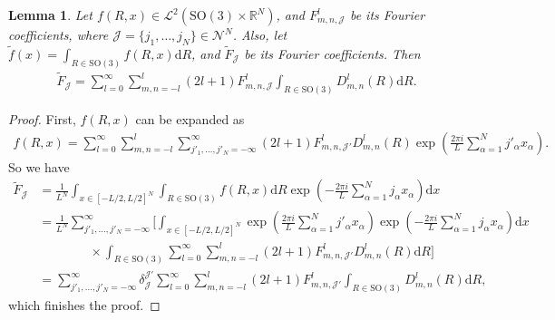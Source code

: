 \documentclass[10pt]{article}
\newtheorem{lemma}{Lemma}
\newcommand{\SO}{\ensuremath{\mathrm{SO}(3)}}
\newcommand{\diff}[1]{\mathrm{d}#1}
\newcommand{\real}{\ensuremath{\mathbb{R}}}
\begin{document}
\begin{lemma} \label{lemma:marginal Fourier}
	Let $f(R,x)\in\mathcal{L}^2(\SO\times\real^N)$, and $F^l_{m,n,\mathcal{J}}$ be its Fourier coefficients, where $\mathcal{J} = \{j_1,\ldots,j_N\} \in \mathcal{N}^N$.
	Also, let $\tilde{f}(x) = \int_{R\in\SO} f(R,x) \diff{R}$, and $\tilde{F}_\mathcal{J}$ be its Fourier coefficients.
	Then
	\begin{align}
		\tilde{F}_{\mathcal{J}} = \sum_{l=0}^\infty \sum_{m,n=-l}^l (2l+1) F^l_{m,n,\mathcal{J}} \int_{R\in\SO} D^l_{m,n}(R) \diff{R}.
	\end{align}
\end{lemma}
\begin{proof}
	First, $f(R,x)$ can be expanded as
	\begin{align*}
		f(R,x) = \sum_{l=0}^\infty \sum_{m,n=-l}^l \sum_{j'_1,\ldots,j'_N=-\infty}^\infty (2l+1) F^l_{m,n,\mathcal{J}'} D^l_{m,n}(R) \exp\left( \frac{2\pi i}{L} \sum_{\alpha=1}^N j'_\alpha x_\alpha \right).
	\end{align*}
	So we have
	\begin{align*}
		\tilde{F}_\mathcal{J} &= \frac{1}{L^N} \int_{x\in[-L/2,L/2]^N} \int_{R\in\SO} f(R,x) \diff{R} \exp\left( -\frac{2\pi i}{L} \sum_{\alpha=1}^N j_\alpha x_\alpha \right) \diff{x} \\
		&= \frac{1}{L^N} \sum_{j'_1,\ldots,j'_N=-\infty}^\infty \bigg[ \int_{x\in[-L/2,L/2]^N}  \exp\left( \frac{2\pi i}{L} \sum_{\alpha=1}^N j'_\alpha x_\alpha \right) \exp\left( -\frac{2\pi i}{L} \sum_{\alpha=1}^N j_\alpha x_\alpha \right) \diff{x} \\
		&\qquad\qquad \times \int_{R\in\SO} \sum_{l=0}^{\infty} \sum_{m,n=-l}^l (2l+1)F^l_{m,n,\mathcal{J}'} D^l_{m,n}(R) \diff{R} \bigg] \\
		&= \sum_{j'_1,\ldots,j'_N=-\infty}^\infty \delta_\mathcal{J}^{\mathcal{J}'} \sum_{l=0}^\infty \sum_{m,n=-l}^l (2l+1)F^l_{m,n,\mathcal{J}'} \int_{R\in\SO} D^l_{m,n}(R) \diff{R},
	\end{align*}
	which finishes the proof.
\end{proof}
\end{document}

